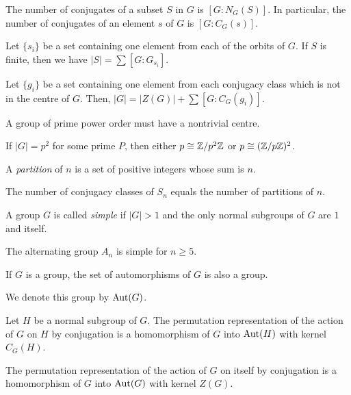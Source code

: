 \begin{cor}
    The number of conjugates of a subset $S$ in $G$ is $[G:N_G(S)]$. In
    particular, the number of conjugates of an element $s$ of $G$ is
    $[G:C_G(s)]$.
\end{cor}
\begin{cor}
    Let $\{s_i\}$ be a set containing one element from each of the orbits of
    $G$. If $S$ is finite, then we have
    $|S|=\sum[G:G_{s_i}]$.
\end{cor}
\begin{cor}
    Let $\{g_i\}$ be a set containing one element from each conjugacy class
    which is not in the centre of $G$. Then,
    $|G|=|Z(G)|+\sum[G:C_G(g_i)]$.
\end{cor}
\begin{cor}
    A group of prime power order must have a nontrivial centre.
\end{cor}
\begin{cor}
    If $|G|=p^2$ for some prime $P$, then either $p\cong\mathbb{Z}/p^2\mathbb{Z}$ or
    $p\cong(\mathbb{Z}/p\mathbb{Z})^2$.
\end{cor}
\begin{defn}
    A \emph{partition} of $n$ is a set of positive integers whose sum is $n$.
\end{defn}
\begin{prop}
    The number of conjugacy classes of $S_n$ equals the number of partitions of
    $n$.
\end{prop}
\begin{defn}
    A group $G$ is called \emph{simple} if $|G|>1$ and the only normal subgroups
    of $G$ are $1$ and itself.
\end{defn}
\begin{prop}
    The alternating group $A_n$ is simple for $n\ge 5$.
\end{prop}
\begin{prop}
    If $G$ is a group, the set of automorphisms of $G$ is also a group.
\end{prop}
\begin{defn}
    We denote this group by $\mathrm{Aut}(G)$.
\end{defn}
\begin{prop}
    Let $H$ be a normal subgroup of $G$. 
    The permutation representation of the action of $G$ on $H$ by conjugation
    is a homomorphism of $G$ into $\mathrm{Aut}(H)$ with kernel $C_G(H)$.
\end{prop}
\begin{cor}
    The permutation representation of the action of $G$ on itself by conjugation
    is a homomorphism of $G$ into $\mathrm{Aut}(G)$ with kernel $Z(G)$.
\end{cor}
